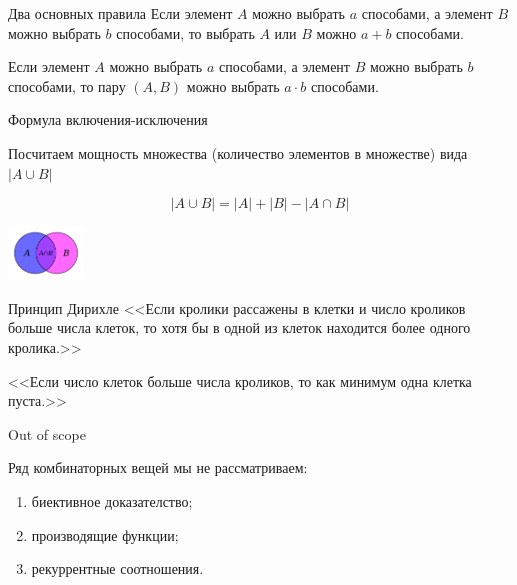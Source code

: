 \begin{frame}{Два основных правила}
Если элемент $A$ можно выбрать $a$ способами,
а элемент $B$ можно выбрать $b$ способами,
то выбрать $A$ или $B$ 
можно $a+b$ способами.

Если элемент $A$ можно выбрать $a$ способами,
а элемент $B$ можно выбрать $b$ способами,
то пару $(A, B)$ 
можно выбрать $a \cdot b$ способами.

\end{frame}

\begin{frame}{Формула включения-исключения}


Посчитаем мощность множества (количество элементов в множестве)
вида $\left| A \cup B \right|$

\begin{equation}
\left| A \cup B \right| = \left|  A \right| + \left|  B \right| - \left| A \cap B \right|
\end{equation}

\centering
	\includegraphics[width=2cm]{../pic/A_intersect_B.svg.png}

\end{frame}

\begin{frame}{Принцип Дирихле}
<<Если кролики рассажены в клетки и число кроликов больше числа клеток, то хотя бы в одной из клеток находится более одного кролика.>>

<<Если число клеток больше числа кроликов, то как минимум одна клетка пуста.>>
\end{frame}

\begin{frame}{Out of scope}

Ряд комбинаторных вещей мы не рассматриваем:
\begin{enumerate}
	\item биективное доказателство; 
	\item производящие функции;
	\item рекуррентные соотношения.
\end{enumerate}

\end{frame}


